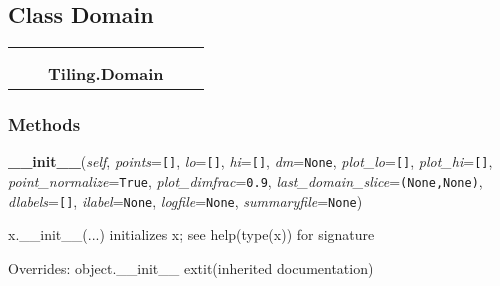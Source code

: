 
\subsection{Class Domain}

    \label{Tiling:Domain}
\begin{tabular}{cccccc}
\multicolumn{2}{r}{\settowidth{\BCL}{object}\multirow{2}{\BCL}{object}}
&&
  \\\cline{3-3}
  &&\multicolumn{1}{c|}{}
&&
  \\
&&\multicolumn{2}{l}{\textbf{Tiling.Domain}}
\end{tabular}



  \subsubsection{Methods}

    \vspace{0.5ex}

\hspace{.8\funcindent}\begin{boxedminipage}{\funcwidth}

    \raggedright \textbf{\_\_init\_\_}(\textit{self}, \textit{points}={\tt []}, \textit{lo}={\tt []}, \textit{hi}={\tt []}, \textit{dm}={\tt None}, \textit{plot\_lo}={\tt []}, \textit{plot\_hi}={\tt []}, \textit{point\_normalize}={\tt True}, \textit{plot\_dimfrac}={\tt 0.9}, \textit{last\_domain\_slice}={\tt (None,None)}, \textit{dlabels}={\tt []}, \textit{ilabel}={\tt None}, \textit{logfile}={\tt None}, \textit{summaryfile}={\tt None})

\setlength{\parskip}{2ex}
    x.\_\_init\_\_(...) initializes x; see help(type(x)) for signature

\setlength{\parskip}{1ex}
      Overrides: object.\_\_init\_\_ 	extit{(inherited documentation)}

    \end{boxedminipage}

